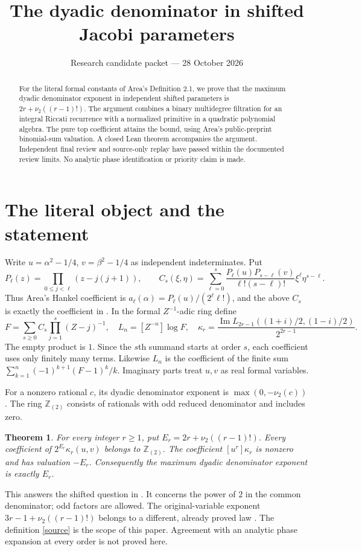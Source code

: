 \documentclass[11pt]{article}
\title{The dyadic denominator in shifted Jacobi parameters}
\author{}\date{Research candidate packet --- 28 October 2026}
\newtheorem{theorem}{Theorem}
\newcommand{\Z}{\mathbb Z}\newcommand{\Q}{\mathbb Q}
\newcommand{\loc}{\Z_{(2)}}\newcommand{\val}{\nu_2}
\newcommand{\coef}[1]{\left[#1\right]}
\begin{document}
\maketitle\vspace{-2em}
\begin{abstract}
For the literal formal constants of Area's Definition 2.1, we prove that the maximum dyadic denominator exponent in independent shifted parameters is $2r+\nu_2((r-1)!)$. The argument combines a binary multidegree filtration for an integral Riccati recurrence with a normalized primitive in a quadratic polynomial algebra. The pure top coefficient attains the bound, using Area's public-preprint binomial-sum valuation. A closed Lean theorem accompanies the argument. Independent final review and source-only replay have passed within the documented review limits. No analytic phase identification or priority claim is made.
\end{abstract}

\section{The literal object and the statement}
Write $u=\alpha^2-1/4$, $v=\beta^2-1/4$ as independent indeterminates. Put
\[
 P_\ell(z)=\prod_{0\le j<\ell}(z-j(j+1)),\qquad
 C_s(\xi,\eta)=\sum_{\ell=0}^s
 \frac{P_\ell(u)P_{s-\ell}(v)}{\ell!(s-\ell)!}\xi^\ell\eta^{s-\ell}.
\]
Thus Area's Hankel coefficient is $a_\ell(\alpha)=P_\ell(u)/(2^\ell\ell!)$, and the above $C_s$ is exactly the coefficient in \cite[Eq.~(6)]{primary}. In the formal $Z^{-1}$-adic ring define
\begin{equation}\label{source}
 F=\sum_{s\ge0}C_s\prod_{j=1}^s(Z-j)^{-1},\quad
 L_n=\coef{Z^{-n}}\log F,\quad
 \kappa_r=\frac{\operatorname{Im}L_{2r-1}((1+i)/2,(1-i)/2)}{2^{2r-1}}.
\end{equation}
The empty product is $1$. Since the $s$th summand starts at order $s$, each coefficient uses only finitely many terms. Likewise $L_n$ is the coefficient of the finite sum $\sum_{k=1}^n(-1)^{k+1}(F-1)^k/k$. Imaginary parts treat $u,v$ as real formal variables.

For a nonzero rational $c$, its dyadic denominator exponent is $\max(0,-\val(c))$. The ring $\loc$ consists of rationals with odd reduced denominator and includes zero.
\begin{theorem}\label{main}
For every integer $r\ge1$, put $E_r=2r+\val((r-1)!)$. Every coefficient of $2^{E_r}\kappa_r(u,v)$ belongs to $\loc$. The coefficient $\coef{u^r}\kappa_r$ is nonzero and has valuation $-E_r$. Consequently the maximum dyadic denominator exponent is exactly $E_r$.
\end{theorem}
This answers the shifted question in \cite[Remark~3.8]{primary}. It concerns the power of $2$ in the common denominator; odd factors are allowed. The original-variable exponent $3r-1+\val((r-1)!)$ belongs to a different, already proved law \cite{companion}. The definition \eqref{source} is the scope of this paper. Agreement with an analytic phase expansion at every order is not proved here.
\end{document}
